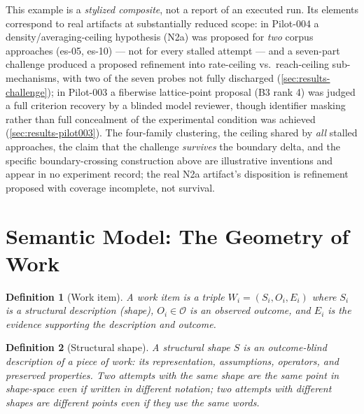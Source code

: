 \documentclass[11pt]{article}
\theoremstyle{gowthm}
\newtheorem{definition}{Definition}[section]
\theoremstyle{gowplain}
\begin{document}
This example is a \emph{stylized composite}, not a report of an executed run.
Its elements correspond to real artifacts at substantially reduced scope: in
Pilot-004 a density/averaging-ceiling hypothesis (N2a) was proposed for
\emph{two} corpus approaches (es-05, es-10) --- not for every stalled attempt
--- and a seven-part challenge produced a proposed refinement into rate-ceiling
vs.\ reach-ceiling sub-mechanisms, with two of the seven probes not fully
discharged (\cref{sec:results-challenge}); in Pilot-003 a fiberwise
lattice-point proposal (B3 rank 4) was judged a full criterion recovery by a
blinded model reviewer, though identifier masking rather than full concealment
of the experimental condition was achieved
(\cref{sec:results-pilot003}). The four-family
clustering, the ceiling shared by \emph{all} stalled approaches, the claim
that the challenge \emph{survives} the boundary delta, and the
specific boundary-crossing construction above are illustrative inventions and
appear in no experiment record; the real N2a artifact's disposition is
refinement proposed with coverage incomplete, not survival.

\section{Semantic Model: The Geometry of Work}
\label{sec:semantic}

\begin{definition}[Work item]
A \emph{work item} is a triple $W_i = (S_i, O_i, E_i)$ where $S_i$ is a
structural description (\emph{shape}), $O_i \in \mathcal{O}$ is an observed
outcome, and $E_i$ is the evidence supporting the description and outcome.
\end{definition}

\begin{definition}[Structural shape]
A \emph{structural shape} $S$ is an outcome-blind description of a piece of
work: its representation, assumptions, operators, and preserved properties.
Two attempts with the same shape are the same point in shape-space even if
written in different notation; two attempts with different shapes are different
points even if they use the same words.
\end{definition}
\end{document}
